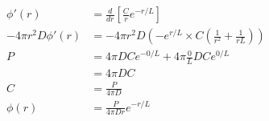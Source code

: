 \documentclass{article}
\begin{document}
\begin{itemize}
\begin{itemize}
\begin{align*}
            \phi'(r)&=\frac{d}{dr}\left[\frac{C}{r}e^{-r/L}\right]\\
            -4\pi r^2D\phi'(r)&=-4\pi r^2D(-e^{r/L}\times C(\frac{1}{r^2}+\frac{1}{rL}))\\
            P&=4\pi DCe^{-0/L}+4\pi\frac{0}{L}DCe^{0/L}\\
            &=4\pi DC\\
            C&=\frac{P}{4\pi D}\\
            \phi(r)&= \frac{P}{4\pi Dr}e^{-r/L}
        \end{align*}
    \end{itemize}
\end{itemize}
\end{document}
